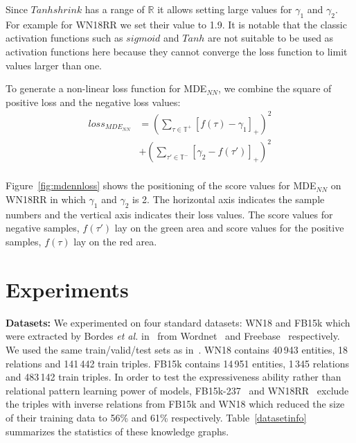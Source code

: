 \documentclass{ecai}
\begin{document}
Since $Tanhshrink$ has a range of $\mathbb{R}$ it allows setting large values for $\gamma_1$ and $\gamma_2$. For example for WN18RR we set their value to 1.9. It is notable that the classic activation functions such as $sigmoid$ and $Tanh$ are not suitable to be used as activation functions here because they cannot converge the loss function to limit values larger than one.

To generate a non-linear loss function for MDE$_{NN}$, we combine the square of positive loss and the negative loss values:
\begin{equation}\label{eq:12}
\begin{split}
loss_{{MDE}_{NN}}  &=  ( \sum_{\tau\in \mathds{T}^+} [f(\tau)- \gamma_1]_+  )^2\\
&+   ( \sum_{\tau'\in \mathds{T}^-} [\gamma_2 - f(\tau')]_+ )^2\\
\end{split}
\end{equation}

Figure~\ref{fig:mdennloss} shows the positioning of the score values for MDE$_{NN}$ on WN18RR in which $\gamma_1$ and $\gamma_2$ is 2. The horizontal axis indicates the sample numbers and the vertical axis indicates their loss values. The score values for negative samples, $f(\tau')$ lay on the green area and score values for the positive samples, $f(\tau)$ lay on the red area. 


\section{Experiments}\label{sec:experiments}
\textbf{Datasets:}
We experimented on four standard datasets: WN18 and FB15k which were extracted by Bordes \textit{et al.} in~\cite{bordes2013translating} from Wordnet~\cite{miller1995wordnet} and Freebase~\cite{bollacker2008freebase} respectively. We used the same train/valid/test sets as in~\cite{bordes2013translating}. WN18 contains 40\,943 entities, 18 relations and 141\,442 train triples. FB15k contains 14\,951 entities, 1\,345 relations and 483\,142 train triples. 
In order to test the expressiveness ability rather than relational pattern learning power of models, FB15k-237~\cite{toutanova2015observed} and WN18RR~\cite{dettmers2018convolutional} exclude the triples with inverse relations from FB15k and WN18 which reduced the size of their training data to 56\% and 61\% respectively. Table~\ref{datasetinfo} summarizes the statistics of these knowledge graphs.  
\end{document}

